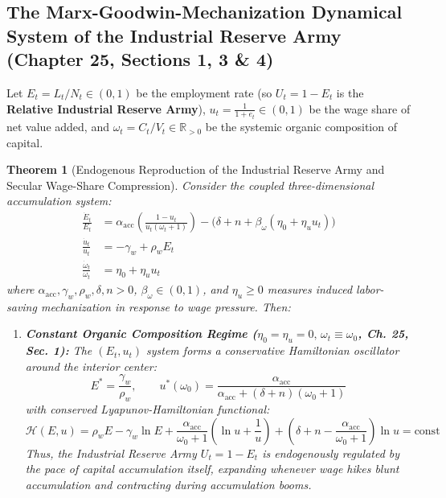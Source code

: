 \documentclass[11pt,a4paper]{article}
\newtheorem{theorem}{Theorem}[section]
\begin{document}
\subsection{The Marx-Goodwin-Mechanization Dynamical System of the Industrial Reserve Army (Chapter 25, Sections 1, 3 \& 4)}

Let $E_t = L_t / N_t \in (0, 1)$ be the employment rate (so $U_t = 1 - E_t$ is the \textbf{Relative Industrial Reserve Army}), $u_t = \frac{1}{1 + e_t} \in (0, 1)$ be the wage share of net value added, and $\omega_t = C_t / V_t \in \mathbb{R}_{>0}$ be the systemic organic composition of capital.

\begin{theorem}[Endogenous Reproduction of the Industrial Reserve Army and Secular Wage-Share Compression]
Consider the coupled three-dimensional accumulation system:
\begin{align}
    \frac{\dot{E}_t}{E_t} &= \alpha_{\text{acc}} \left(\frac{1 - u_t}{u_t (\omega_t + 1)}\right) - \big(\delta + n + \beta_\omega (\eta_0 + \eta_u u_t)\big) \\
    \frac{\dot{u}_t}{u_t} &= -\gamma_w + \rho_w E_t \\
    \frac{\dot{\omega}_t}{\omega_t} &= \eta_0 + \eta_u u_t
\end{align}
where $\alpha_{\text{acc}}, \gamma_w, \rho_w, \delta, n > 0$, $\beta_\omega \in (0, 1)$, and $\eta_u \ge 0$ measures induced labor-saving mechanization in response to wage pressure. Then:
\begin{enumerate}[label=(\arabic*)]
    \item \textbf{Constant Organic Composition Regime ($\eta_0 = \eta_u = 0, \, \omega_t \equiv \omega_0$, Ch. 25, Sec. 1):} The $(E_t, u_t)$ system forms a conservative Hamiltonian oscillator around the interior center:
    \begin{equation}
        E^* = \frac{\gamma_w}{\rho_w}, \qquad u^*(\omega_0) = \frac{\alpha_{\text{acc}}}{\alpha_{\text{acc}} + (\delta + n)(\omega_0 + 1)}
    \end{equation}
    with conserved Lyapunov-Hamiltonian functional:
    \begin{equation}
        \mathcal{H}(E, u) = \rho_w E - \gamma_w \ln E + \frac{\alpha_{\text{acc}}}{\omega_0 + 1}\left(\ln u + \frac{1}{u}\right) + (\delta + n - \frac{\alpha_{\text{acc}}}{\omega_0 + 1})\ln u = \text{const}
    \end{equation}
    Thus, the Industrial Reserve Army $U_t = 1 - E_t$ is endogenously regulated by the pace of capital accumulation itself, expanding whenever wage hikes blunt accumulation and contracting during accumulation booms.

\end{enumerate}
\end{theorem}
\end{document}

